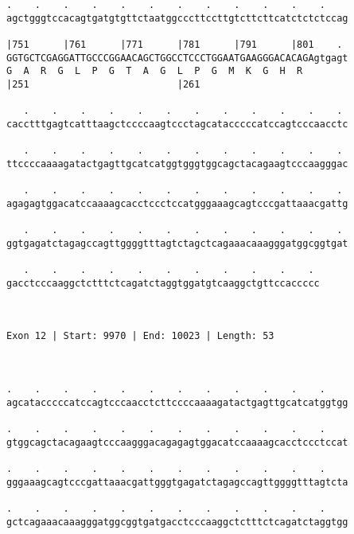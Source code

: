\documentclass{article}
\begin{document}
\begin{Verbatim}
.    .    .    .    .    .    .    .    .    .    .    .    
agctgggtccacagtgatgtgttctaatggcccttccttgtcttcttcatctctctccag
                                                            
|751      |761      |771      |781      |791      |801    . 
GGTGCTCGAGGATTGCCCGGAACAGCTGGCCTCCCTGGAATGAAGGGACACAGAgtgagt
G  A  R  G  L  P  G  T  A  G  L  P  G  M  K  G  H  R        
|251                          |261                          
  
   .    .    .    .    .    .    .    .    .    .    .    . 
cacctttgagtcatttaagctccccaagtccctagcatacccccatccagtcccaacctc
                                                            
   .    .    .    .    .    .    .    .    .    .    .    . 
ttccccaaaagatactgagttgcatcatggtgggtggcagctacagaagtcccaagggac
                                                            
   .    .    .    .    .    .    .    .    .    .    .    . 
agagagtggacatccaaaagcacctccctccatgggaaagcagtcccgattaaacgattg
                                                            
   .    .    .    .    .    .    .    .    .    .    .    . 
ggtgagatctagagccagttggggtttagtctagctcagaaacaaagggatggcggtgat
                                                            
   .    .    .    .    .    .    .    .    .    .    . 
gacctcccaaggctctttctcagatctaggtggatgtcaaggctgttccaccccc
                                                       
                                                       
 
Exon 12 | Start: 9970 | End: 10023 | Length: 53



.    .    .    .    .    .    .    .    .    .    .    .    
agcatacccccatccagtcccaacctcttccccaaaagatactgagttgcatcatggtgg
                                                            
.    .    .    .    .    .    .    .    .    .    .    .    
gtggcagctacagaagtcccaagggacagagagtggacatccaaaagcacctccctccat
                                                            
.    .    .    .    .    .    .    .    .    .    .    .    
gggaaagcagtcccgattaaacgattgggtgagatctagagccagttggggtttagtcta
                                                            
.    .    .    .    .    .    .    .    .    .    .    .    
gctcagaaacaaagggatggcggtgatgacctcccaaggctctttctcagatctaggtgg
                                                            

\end{Verbatim}
\end{document}
